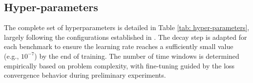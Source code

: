 \begin{table}
\renewcommand{\arraystretch}{1.2}
\centering
\caption{Parameter settings and numerical configurations for generating the reference solution across PDE benchmarks.}
\label{tab: data_gen}
\vspace{1mm}
\end{table}

\subsection{Hyper-parameters}
The complete set of hyperparameters is detailed in Table \ref{tab: hyper-parameters}, largely following the configurations established in \cite{wang2023expert,wang2024piratenets}. The decay step is adapted for each benchmark to ensure the learning rate reaches a sufficiently small value (e.g., $10^{-7}$) by the end of training. The number of time windows is determined empirically based on problem complexity, with fine-tuning guided by the loss convergence behavior during preliminary experiments. 

